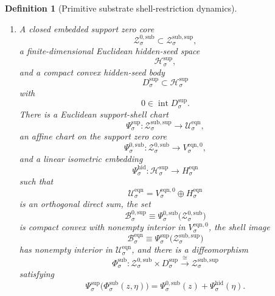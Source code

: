 \documentclass[11pt]{article}
\newcommand{\EqnSpace}[1]{\mathcal U_{#1}^{\mathrm{eqn}}}
\newcommand{\EqnBody}[1]{\mathcal B_{#1}^{\mathrm{eqn}}}
\newcommand{\EqnZero}[1]{V_{#1}^{\mathrm{eqn},0}}
\newcommand{\EqnHidden}[1]{H_{#1}^{\mathrm{eqn}}}
\newcommand{\ResSpace}[1]{\mathcal U_{#1}^{\mathrm{sup,res}}}
\newcommand{\ResBody}[1]{\mathcal B_{#1}^{\mathrm{sup,res}}}
\newcommand{\ResPair}[1]{\mathfrak m_{#1}^{\mathrm{sup,res}}}
\newcommand{\ResSection}[1]{\Theta_{#1}^{\mathrm{sup,res}}}
\newcommand{\ResData}[1]{\Lambda_{#1}^{\mathrm{sup,dat}}}
\newcommand{\ResShellMap}[1]{\Lambda_{#1}^{\mathrm{sup,sh}}}
\newcommand{\ResShellSet}[1]{\mathcal Z_{#1}^{\mathrm{sup,res}}}
\newcommand{\SeedHidden}[1]{\mathcal H_{#1}^{\mathrm{sup}}}
\newcommand{\SeedHiddenBody}[1]{D_{#1}^{\mathrm{sup}}}
\newcommand{\ShellChart}[1]{\Psi_{#1}^{\mathrm{sup}}}
\newcommand{\HiddenChart}[1]{\Psi_{#1}^{\mathrm{hid}}}
\newcommand{\ZeroBody}[1]{\mathcal B_{#1}^{0,\mathrm{sup}}}
\newcommand{\SubChart}[1]{\Xi_{#1}^{\mathrm{sub}}}
\newcommand{\SubSupportShell}[1]{\mathcal Z_{#1}^{\mathrm{sub,sup}}}
\newcommand{\SubZeroCore}[1]{\mathcal Z_{#1}^{0,\mathrm{sub}}}
\newcommand{\SubZeroChart}[1]{\Psi_{#1}^{0,\mathrm{sub}}}
\newcommand{\SubSplit}[1]{\Phi_{#1}^{\mathrm{sub}}}
\newtheorem{definition}{Definition}
\begin{document}
\begin{definition}[Primitive substrate shell-restriction dynamics]
\begin{enumerate}
\begin{equation}
    \end{equation}
    Assume there exists \(\nu_{\sigma}^{\mathrm{sup}}>0\) such that
    \begin{equation}
    \ResPair{\sigma}\bigl(\ResSection{\sigma}(u),\ResSection{\sigma}(u)\bigr)
    \ge
    \nu_{\sigma}^{\mathrm{sup}}\,
    \operatorname{dist}\bigl(u,\ResShellSet{\sigma}\bigr)^{2}
    \qquad
    \text{for all }u\in\ResBody{\sigma}.
    \label{eq:transportednormal}
    \end{equation}
    The symmetry and time-reversal actions transported through \(\SubChart{\sigma}\) act linearly on \(\ResSpace{\sigma}\), preserving \(\ResBody{\sigma}\), \(\ResShellSet{\sigma}\), \(\ResSection{\sigma}\), \(\ResData{\sigma}\), and \(\ResShellMap{\sigma}\).
    \item A closed embedded support zero core
    \[
    \SubZeroCore{\sigma}\subset\SubSupportShell{\sigma},
    \]
    a finite-dimensional Euclidean hidden-seed space
    \[
    \SeedHidden{\sigma},
    \]
    and a compact convex hidden-seed body
    \[
    \SeedHiddenBody{\sigma}\subset\SeedHidden{\sigma}
    \]
    with
    \[
    0\in\operatorname{int}\SeedHiddenBody{\sigma}.
    \]
    There is a Euclidean support-shell chart
    \[
    \ShellChart{\sigma}:\SubSupportShell{\sigma}\to\EqnSpace{\sigma},
    \]
    an affine chart on the support zero core
    \[
    \SubZeroChart{\sigma}:\SubZeroCore{\sigma}\to\EqnZero{\sigma},
    \]
    and a linear isometric embedding
    \[
    \HiddenChart{\sigma}:\SeedHidden{\sigma}\to\EqnHidden{\sigma}
    \]
    such that
    \[
    \EqnSpace{\sigma}
    =
    \EqnZero{\sigma}\oplus\EqnHidden{\sigma}
    \]
    is an orthogonal direct sum, the set
    \[
    \ZeroBody{\sigma}
    \equiv
    \SubZeroChart{\sigma}\bigl(\SubZeroCore{\sigma}\bigr)
    \]
    is compact convex with nonempty interior in \(\EqnZero{\sigma}\), the shell image
    \[
    \EqnBody{\sigma}
    \equiv
    \ShellChart{\sigma}\bigl(\SubSupportShell{\sigma}\bigr)
    \]
    has nonempty interior in \(\EqnSpace{\sigma}\), and there is a diffeomorphism
    \begin{equation}
    \SubSplit{\sigma}:
    \SubZeroCore{\sigma}
    \times
    \SeedHiddenBody{\sigma}
    \xrightarrow{\cong}
    \SubSupportShell{\sigma}
    \label{eq:subsplit}
    \end{equation}
    satisfying
    \begin{equation}
    \ShellChart{\sigma}\bigl(\SubSplit{\sigma}(z,\eta)\bigr)
    =
    \SubZeroChart{\sigma}(z)+\HiddenChart{\sigma}(\eta).
    \label{eq:subchartsplit}

\end{equation}
\end{enumerate}
\end{definition}
\end{document}
